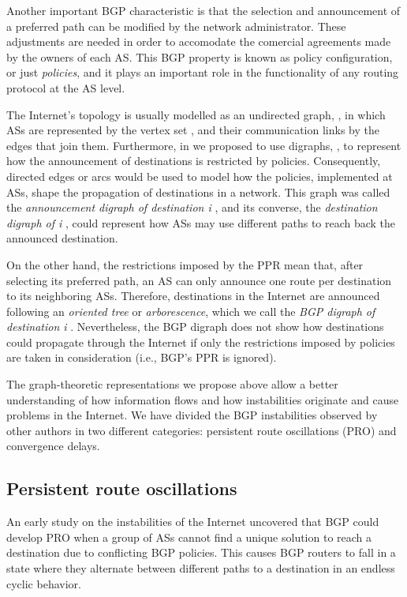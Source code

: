 \documentclass[5p,twocolumn]{elsarticle}
\begin{document}
Another important BGP characteristic is that the selection and announcement of a preferred path  can be modified by the network administrator. These adjustments are needed in order to accomodate the comercial agreements made by the owners of each AS. This BGP property is known as policy configuration, or just \emph{policies}, and it plays an important role in the functionality of any routing protocol at the AS level.

The Internet's topology is usually modelled as an undirected graph, , in which ASs are represented by the vertex set , and their communication links by the edges  that join them. Furthermore, in \cite{Arjona-Villicana2010} we proposed to use digraphs, , to represent how the announcement of destinations is restricted by policies. Consequently, directed edges or arcs  would be used to model how the policies, implemented at ASs, shape the propagation of destinations in a network. This graph was called the \emph{announcement digraph of destination i} , and its converse, the \emph{destination digraph of i} , could represent how ASs may use different paths to reach back the announced destination.

On the other hand, the restrictions imposed by the PPR mean that, after selecting its preferred path, an AS can only announce one route per destination to its neighboring ASs. Therefore, destinations in the Internet are announced following an \emph{oriented tree} or \emph{arborescence}, which we call the \emph{BGP digraph of destination i} . Nevertheless, the BGP digraph does not show how destinations could propagate through the Internet if only the restrictions imposed by policies are taken in consideration (i.e., BGP's PPR is ignored).

The graph-theoretic representations we propose above allow a better understanding of how information flows and how instabilities originate and cause problems in the Internet. We have divided the BGP instabilities observed by other authors in two different categories: persistent route oscillations (PRO) and convergence delays.


\subsection{Persistent route oscillations}\label{pro}

An early study on the instabilities of the Internet \cite{Varadhan1996} uncovered that BGP could develop PRO when a group of ASs cannot find a unique solution to reach a destination due to conflicting BGP policies. This causes BGP routers to fall in a state where they alternate between different paths to a destination in an endless cyclic behavior.
\end{document}
